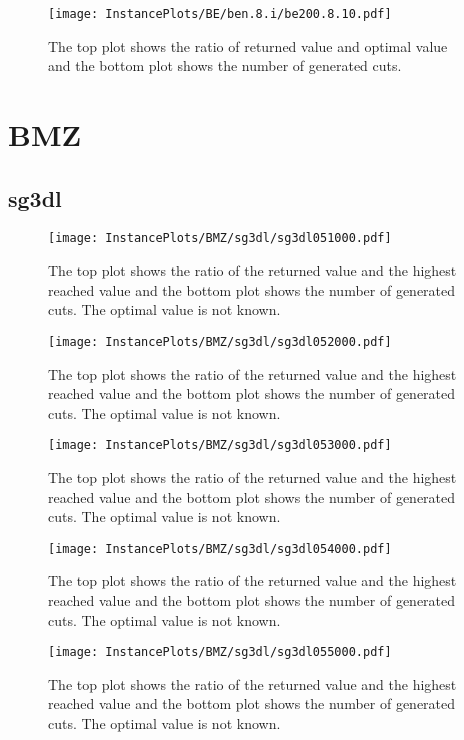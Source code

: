 \documentclass[10pt,a4paper]{article}
\begin{document}
\begin{figure}[H]
\texttt{[image: InstancePlots/BE/ben.8.i/be200.8.10.pdf]}
\caption{The top plot shows the ratio of returned value and optimal value     and the bottom plot shows the number of generated cuts.}
\end{figure}

\section{BMZ}
\subsection{sg3dl}
\begin{figure}[H]
\texttt{[image: InstancePlots/BMZ/sg3dl/sg3dl051000.pdf]}
\caption{The top plot shows the ratio of the returned value and the highest reached value     and the bottom plot shows the number of generated cuts. The optimal value is not known.}
\end{figure}

\begin{figure}[H]
\texttt{[image: InstancePlots/BMZ/sg3dl/sg3dl052000.pdf]}
\caption{The top plot shows the ratio of the returned value and the highest reached value     and the bottom plot shows the number of generated cuts. The optimal value is not known.}
\end{figure}

\begin{figure}[H]
\texttt{[image: InstancePlots/BMZ/sg3dl/sg3dl053000.pdf]}
\caption{The top plot shows the ratio of the returned value and the highest reached value     and the bottom plot shows the number of generated cuts. The optimal value is not known.}
\end{figure}

\begin{figure}[H]
\texttt{[image: InstancePlots/BMZ/sg3dl/sg3dl054000.pdf]}
\caption{The top plot shows the ratio of the returned value and the highest reached value     and the bottom plot shows the number of generated cuts. The optimal value is not known.}
\end{figure}

\begin{figure}[H]
\texttt{[image: InstancePlots/BMZ/sg3dl/sg3dl055000.pdf]}
\caption{The top plot shows the ratio of the returned value and the highest reached value     and the bottom plot shows the number of generated cuts. The optimal value is not known.}
\end{figure}
\end{document}
